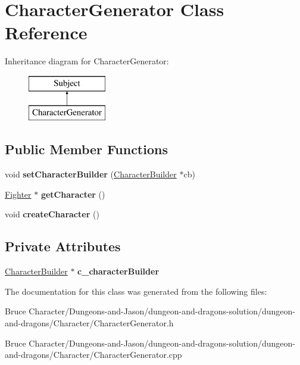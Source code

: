 \hypertarget{class_character_generator}{}\section{Character\+Generator Class Reference}
\label{class_character_generator}
Inheritance diagram for Character\+Generator\+:\begin{figure}[H]
\begin{center}
\leavevmode
\includegraphics[height=2.000000cm]{class_character_generator}
\end{center}
\end{figure}
\subsection*{Public Member Functions}
\begin{DoxyCompactItemize}
\item 
\hypertarget{class_character_generator_a5cc639f2cc152fd836d284e5b1d8cad5}{}\label{class_character_generator_a5cc639f2cc152fd836d284e5b1d8cad5} 
void {\bfseries set\+Character\+Builder} (\hyperlink{class_character_builder}{Character\+Builder} $\ast$cb)
\item 
\hypertarget{class_character_generator_a092019b84490164c0e58226b2f7c621d}{}\label{class_character_generator_a092019b84490164c0e58226b2f7c621d} 
\hyperlink{class_fighter}{Fighter} $\ast$ {\bfseries get\+Character} ()
\item 
\hypertarget{class_character_generator_a3b4eb565e68eeecac901688290bd92ef}{}\label{class_character_generator_a3b4eb565e68eeecac901688290bd92ef} 
void {\bfseries create\+Character} ()
\end{DoxyCompactItemize}
\subsection*{Private Attributes}
\begin{DoxyCompactItemize}
\item 
\hypertarget{class_character_generator_adc09e630f5d79b2b102a323cd6ab8694}{}\label{class_character_generator_adc09e630f5d79b2b102a323cd6ab8694} 
\hyperlink{class_character_builder}{Character\+Builder} $\ast$ {\bfseries c\+\_\+character\+Builder}
\end{DoxyCompactItemize}


The documentation for this class was generated from the following files\+:\begin{DoxyCompactItemize}
\item 
Bruce Character/\+Dungeons-\/and-\/\+Jason/dungeon-\/and-\/dragons-\/solution/dungeon-\/and-\/dragons/\+Character/Character\+Generator.\+h\item 
Bruce Character/\+Dungeons-\/and-\/\+Jason/dungeon-\/and-\/dragons-\/solution/dungeon-\/and-\/dragons/\+Character/Character\+Generator.\+cpp\end{DoxyCompactItemize}
